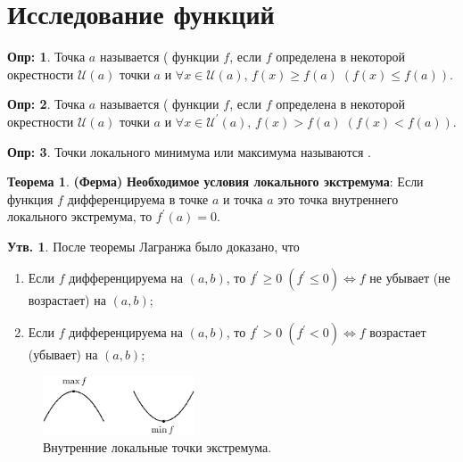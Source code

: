 \documentclass[12pt]{article}
\newcommand{\MU}{\mathcal{U}}
\theoremstyle{definition}
\newtheorem{defn}{Опр:}
\newtheorem{prop}{Утв.}
\newtheorem{theorem}{Теорема}
\begin{document}
\section*{Исследование функций}

\begin{defn}
	Точка $a$ называется  ( функции $f$, если $f$ определена в некоторой окрестности $\MU(a)$ точки $a$ и $\forall x \in \MU(a), \, f(x) \geq f(a) \; (f(x) \leq f(a))$. 
\end{defn}

\begin{defn}
	Точка $a$ называется  (  функции $f$, если $f$ определена в некоторой окрестности $\MU(a)$ точки $a$ и $\forall x \in \MU^\prime(a), \, f(x) > f(a) \; (f(x) < f(a))$. 
\end{defn}

\begin{defn}
	Точки локального минимума или максимума называются .
\end{defn}

\begin{theorem}\textbf{(Ферма)} \textbf{Необходимое условия локального экстремума}:
	Если функция $f$ дифференцируема в точке $a$ и точка $a$ это точка внутреннего локального экстремума, то $f^\prime(a) = 0$.
\end{theorem}

\begin{prop}
	После теоремы Лагранжа было доказано, что 
	\begin{enumerate}[label={(\arabic*)}]
		\item Если $f$ дифференцируема на $(a,b)$, то $f^\prime \geq 0 \; (f^\prime \leq 0) \Leftrightarrow f$ не убывает (не возрастает) на $(a,b)$;
		\item Если $f$ дифференцируема на $(a,b)$, то $f^\prime > 0 \; (f^\prime < 0) \Leftrightarrow f$ возрастает (убывает) на $(a,b)$;
	\end{enumerate}
\end{prop}


\begin{figure}[H]
	\centering
	\includegraphics[width=0.4\textwidth]{27_1.eps}
	\caption{Внутренние локальные точки экстремума.}
	\label{27_1}
\end{figure}
\end{document}
